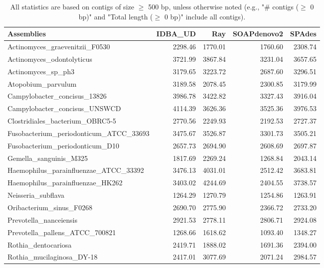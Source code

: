 \documentclass[12pt,a4paper]{article}
\begin{document}
\begin{table}[ht]
\begin{center}
\caption{All statistics are based on contigs of size $\geq$ 500 bp, unless otherwise noted (e.g., "\# contigs ($\geq$ 0 bp)" and "Total length ($\geq$ 0 bp)" include all contigs).}
\begin{tabular}{|l*{4}{|r}|}
\hline
Assemblies & IDBA\_UD & Ray & SOAPdenovo2 & SPAdes \\ \hline
Actinomyces\_graevenitzii\_F0530 & 2298.46 & 1770.01 & 1760.60 & 2308.74 \\ \hline
Actinomyces\_odontolyticus & 3721.99 & 3867.84 & 3231.04 & 3657.65 \\ \hline
Actinomyces\_sp\_ph3 & 3179.65 & 3223.72 & 2687.60 & 3296.51 \\ \hline
Atopobium\_parvulum & 3189.58 & 2078.45 & 2300.85 & 3179.99 \\ \hline
Campylobacter\_concisus\_13826 & 3986.78 & 3422.82 & 3327.43 & 3916.04 \\ \hline
Campylobacter\_concisus\_UNSWCD & 4114.39 & 3626.36 & 3525.36 & 3976.53 \\ \hline
Clostridiales\_bacterium\_OBRC5-5 & 2770.56 & 2249.93 & 2192.53 & 2727.37 \\ \hline
Fusobacterium\_periodonticum\_ATCC\_33693 & 3475.67 & 3526.87 & 3301.73 & 3505.21 \\ \hline
Fusobacterium\_periodonticum\_D10 & 2657.73 & 2694.90 & 2608.69 & 2697.87 \\ \hline
Gemella\_sanguinis\_M325 & 1817.69 & 2269.24 & 1268.84 & 2043.14 \\ \hline
Haemophilus\_parainfluenzae\_ATCC\_33392 & 3476.13 & 4031.01 & 2512.42 & 3683.81 \\ \hline
Haemophilus\_parainfluenzae\_HK262 & 3403.02 & 4244.69 & 2404.55 & 3738.57 \\ \hline
Neisseria\_subflava & 1264.29 & 1270.79 & 1254.86 & 1263.91 \\ \hline
Oribacterium\_sinus\_F0268 & 2690.70 & 2775.90 & 2366.72 & 2733.20 \\ \hline
Prevotella\_nanceiensis & 2921.53 & 2778.11 & 2806.71 & 2924.08 \\ \hline
Prevotella\_pallens\_ATCC\_700821 & 1268.66 & 1618.62 & 1093.40 & 1348.27 \\ \hline
Rothia\_dentocariosa & 2419.71 & 1888.02 & 1691.36 & 2394.00 \\ \hline
Rothia\_mucilaginosa\_DY-18 & 2417.01 & 3077.69 & 2071.24 & 2984.57 \\ \hline

\end{tabular}
\end{center}
\end{table}
\end{document}

